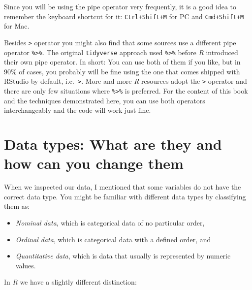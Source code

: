 \documentclass[
  letterpaper,
  DIV=11,
  numbers=noendperiod]{scrreprt}
\begin{document}
Since you will be using the pipe operator very frequently, it is a good
idea to remember the keyboard shortcut for it: \texttt{Ctrl+Shift+M} for
PC and \texttt{Cmd+Shift+M} for Mac.

Besides \texttt{\textbar{}\textgreater{}} operator you might also find
that some sources use a different pipe operator
\texttt{\%\textgreater{}\%}. The original \texttt{tidyverse} approach
used \texttt{\%\textgreater{}\%} before \emph{R} introduced their own
pipe operator. In short: You can use both of them if you like, but in
90\% of cases, you probably will be fine using the one that comes
shipped with RStudio by default, i.e.~\texttt{\textbar{}\textgreater{}}.
More and more \emph{R} resources adopt the
\texttt{\textbar{}\textgreater{}} operator and there are only few
situations where \texttt{\%\textgreater{}\%} is preferred. For the
content of this book and the techniques demonstrated here, you can use
both operators interchangeably and the code will work just fine.

\section{Data types: What are they and how can you change
them}\label{sec-change-data-types}

When we inspected our data, I mentioned that some variables do not have
the correct data type. You might be familiar with different data types
by classifying them as:

\begin{itemize}
\item
  \emph{Nominal data}, which is categorical data of no particular order,
\item
  \emph{Ordinal data}, which is categorical data with a defined order,
  and
\item
  \emph{Quantitative data}, which is data that usually is represented by
  numeric values.
\end{itemize}

In \emph{R} we have a slightly different distinction:
\end{document}
